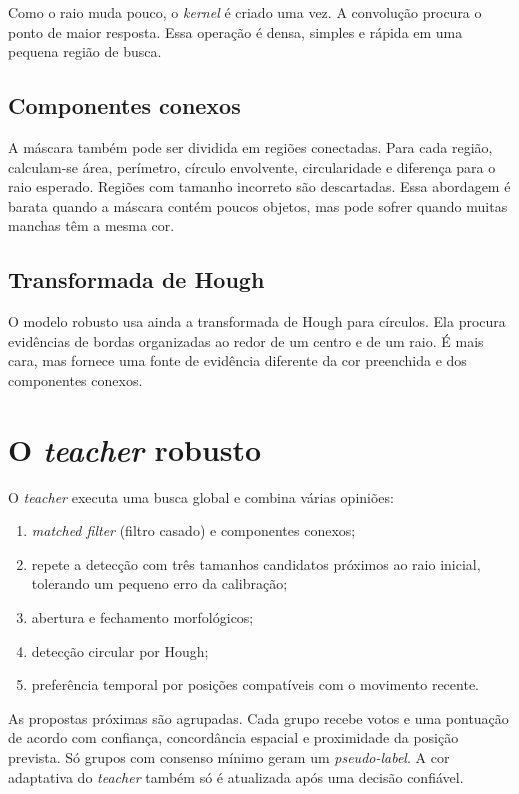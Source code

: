 \documentclass[11pt,a4paper]{article}
\begin{document}
Como o raio muda pouco, o \textit{kernel} é criado uma vez. A convolução procura o ponto de maior
resposta. Essa operação é densa, simples e rápida em uma pequena região de busca.

\subsection{Componentes conexos}

A máscara também pode ser dividida em regiões conectadas. Para cada região, calculam-se
área, perímetro, círculo envolvente, circularidade e diferença para o raio esperado. Regiões
com tamanho incorreto são descartadas. Essa abordagem é barata quando a máscara contém
poucos objetos, mas pode sofrer quando muitas manchas têm a mesma cor.

\subsection{Transformada de Hough}

O modelo robusto usa ainda a transformada de Hough para círculos. Ela procura evidências de
bordas organizadas ao redor de um centro e de um raio. É mais cara, mas fornece uma fonte de
evidência diferente da cor preenchida e dos componentes conexos.

\section{O \textit{teacher} robusto}

O \textit{teacher} executa uma busca global e combina várias opiniões:

\begin{enumerate}
  \item \textit{matched filter} (filtro casado) e componentes conexos;
  \item repete a detecção com três tamanhos candidatos próximos ao raio inicial, tolerando
  um pequeno erro da calibração;
  \item abertura e fechamento morfológicos;
  \item detecção circular por Hough;
  \item preferência temporal por posições compatíveis com o movimento recente.
\end{enumerate}

As propostas próximas são agrupadas. Cada grupo recebe votos e uma pontuação de acordo com
confiança, concordância espacial e proximidade da posição prevista. Só grupos com consenso
mínimo geram um \textit{pseudo-label}. A cor adaptativa do \textit{teacher} também só é atualizada após
uma decisão confiável.
\end{document}
